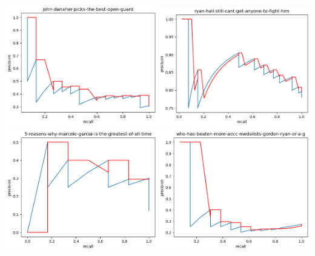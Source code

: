 \includegraphics[width=0.5\textwidth]{images/john-danaher-picks-the-best-open-guard_precision-recall.png}\includegraphics[width=0.5\textwidth]{images/ryan-hall-still-cant-get-anyone-to-fight-him_precision-recall.png} \\
\includegraphics[width=0.5\textwidth]{images/5-reasons-why-marcelo-garcia-is-the-greatest-of-all-time_precision-recall.png}\includegraphics[width=0.5\textwidth]{images/who-has-beaten-more-adcc-medalists-gordon-ryan-or-andre-galvao_precision-recall.png} \\

